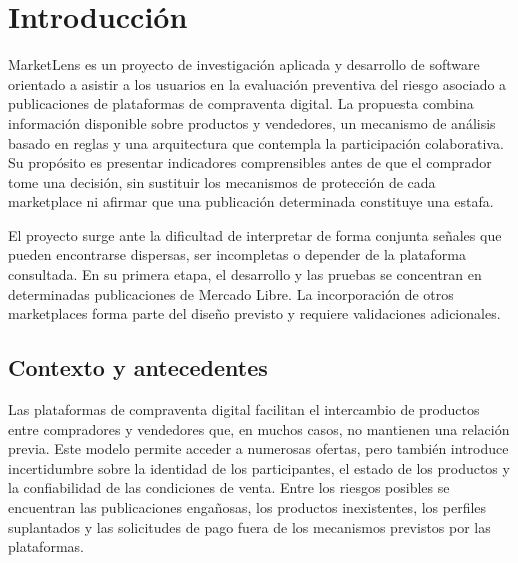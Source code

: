 
\chapter{Introducción}\label{cap:introduccion}

MarketLens es un proyecto de investigación aplicada y desarrollo de software orientado a asistir a los usuarios en la evaluación preventiva del riesgo asociado a publicaciones de plataformas de compraventa digital. La propuesta combina información disponible sobre productos y vendedores, un mecanismo de análisis basado en reglas y una arquitectura que contempla la participación colaborativa. Su propósito es presentar indicadores comprensibles antes de que el comprador tome una decisión, sin sustituir los mecanismos de protección de cada marketplace ni afirmar que una publicación determinada constituye una estafa.

El proyecto surge ante la dificultad de interpretar de forma conjunta señales que pueden encontrarse dispersas, ser incompletas o depender de la plataforma consultada. En su primera etapa, el desarrollo y las pruebas se concentran en determinadas publicaciones de Mercado Libre. La incorporación de otros marketplaces forma parte del diseño previsto y requiere validaciones adicionales.

\section{Contexto y antecedentes}\label{sec:ml-contexto}

Las plataformas de compraventa digital facilitan el intercambio de productos entre compradores y vendedores que, en muchos casos, no mantienen una relación previa. Este modelo permite acceder a numerosas ofertas, pero también introduce incertidumbre sobre la identidad de los participantes, el estado de los productos y la confiabilidad de las condiciones de venta. Entre los riesgos posibles se encuentran las publicaciones engañosas, los productos inexistentes, los perfiles suplantados y las solicitudes de pago fuera de los mecanismos previstos por las plataformas.

